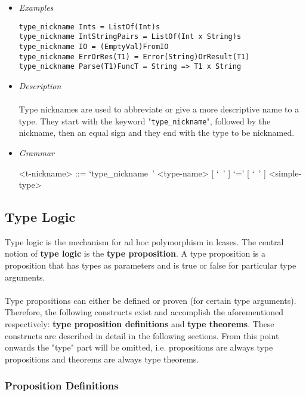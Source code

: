 \documentclass{article}
\begin{document}
\begin{itemize}

\item \textit{Examples}

\begin{verbatim}
type_nickname Ints = ListOf(Int)s
type_nickname IntStringPairs = ListOf(Int x String)s
type_nickname IO = (EmptyVal)FromIO
type_nickname ErrOrRes(T1) = Error(String)OrResult(T1)
type_nickname Parse(T1)FuncT = String => T1 x String
\end{verbatim}

\item \textit{Description} \\\\
Type nicknames are used to abbreviate or give a more descriptive name to a type.
They start with the keyword "\texttt{type_nickname}", followed by the nickname, 
then an equal sign and they end with the type to be nicknamed.

\item \textit{Grammar}

\begin{grammar}
<t-nickname> ::= `type_nickname\ ' <type-name> [ `\ ' ] `=' [ `\ ' ] <simple-type>
\end{grammar} 

\end{itemize}

\subsection{Type Logic}
\label{subsec:typelogic}

Type logic is the mechanism for ad hoc polymorphism in lcases. The central
notion of \textbf{type logic} is the \textbf{type proposition}. A type
proposition is a proposition that has types as parameters and is true or false
for particular type arguments.
\\\\
Type propositions can either be defined or proven (for certain type arguments).
Therefore, the following constructs exist and accomplish the aforementioned
respectively: \textbf{type proposition definitions} and \textbf{type theorems}.
These constructs are described in detail in the following sections. From this
point onwards the "type" part will be omitted, i.e. propositions are always
type propositions and theorems are always type theorems. 

\subsubsection{Proposition Definitions}
\end{document}
